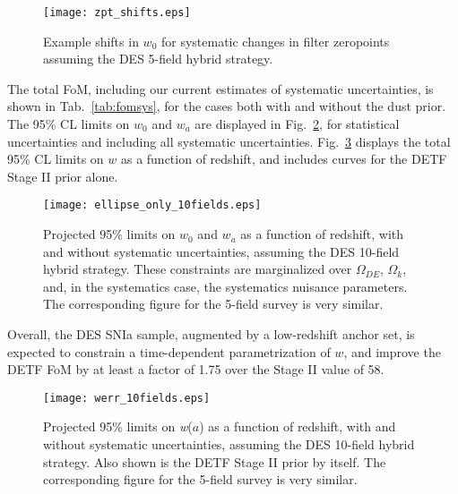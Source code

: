 \documentclass[preprint2]{aastex}    %
\begin{document}
\begin{figure}[ht]
\centerline{\texttt{[image: zpt\_shifts.eps]}}
\caption{Example shifts in $w_0$ for systematic changes in 
filter zeropoints assuming the DES 5-field hybrid strategy.}
\label{fig:zpt_shifts}
\end{figure}

The total FoM, including our current estimates of 
systematic uncertainties, is shown in 
Tab.~\ref{tab:fomsys}, for the 
cases both with and without the dust prior.  The 95\% CL limits 
on $w_0$ and $w_a$ are displayed in Fig.~\ref{fig:ellipse}, 
for statistical uncertainties and including all systematic uncertainties.
Fig.~\ref{fig:werr} displays the total 95\% CL limits on 
$w$ as a function of redshift, and includes curves for
the DETF Stage II prior alone.  

\begin{figure}[ht]
\centerline{\texttt{[image: ellipse\_only\_10fields.eps]}}
\caption{Projected 95\% limits on $w_0$ and $w_a$ as a function of redshift, with and 
without systematic uncertainties, assuming the DES 10-field hybrid strategy. These 
constraints are marginalized over $\Omega_{DE}$, $\Omega_k$, and, in the systematics 
case, the systematics nuisance parameters. 
The corresponding figure for the 5-field survey is very similar. 
}
\label{fig:ellipse}
\end{figure}

Overall, the DES SNIa sample,  augmented by a low-redshift anchor set, 
is expected to constrain a time-dependent parametrization of 
$w$,  and improve the DETF FoM by at least a factor of 1.75 over the 
Stage II value of 58.  

\begin{figure}[ht]
\centerline{\texttt{[image: werr\_10fields.eps]}}
\caption{Projected 95\% limits on {\it w}($a$) as a function of redshift, with and 
without systematic uncertainties, assuming the DES 10-field hybrid strategy. 
Also shown is the DETF Stage II prior by itself.
The corresponding figure for the 5-field survey is very similar.}
\label{fig:werr}
\end{figure}
\end{document}
